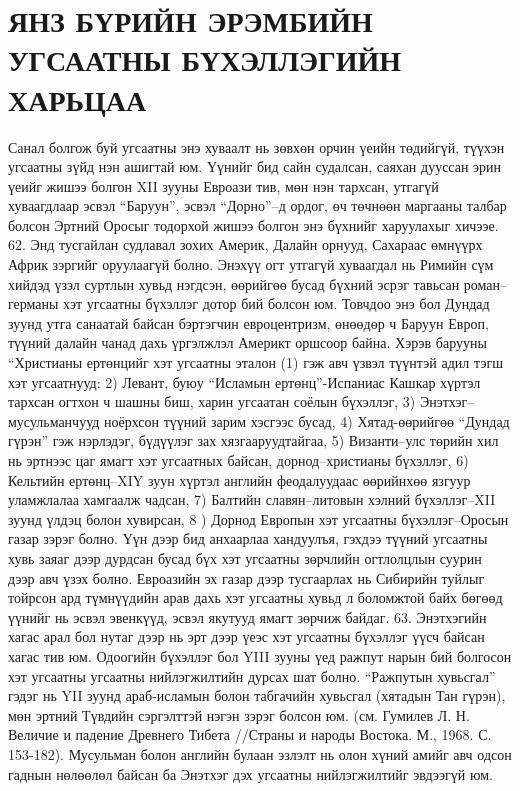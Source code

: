 \section{ЯНЗ БҮРИЙН ЭРЭМБИЙН УГСААТНЫ БҮХЭЛЛЭГИЙН ХАРЬЦАА}
Санал болгож буй угсаатны энэ хуваалт нь зөвхөн орчин үеийн төдийгүй, түүхэн угсаатны зүйд нэн ашигтай юм. Үүнийг бид сайн судалсан, саяхан дууссан эрин үеийг жишээ болгон XII зууны Евроази тив, мөн нэн тархсан, утгагүй хуваагдлаар эсвэл “Баруун”, эсвэл “Дорно”–д ордог, өч төчнөөн маргааны талбар болсон Эртний Оросыг тодорхой жишээ болгон энэ бүхнийг харуулахыг хичээе. 62. Энд тусгайлан судлавал зохих Америк, Далайн орнууд, Сахараас өмнүүрх Африк зэргийг оруулаагүй болно.
Энэхүү огт утгагүй хуваагдал нь Римийн сүм хийдэд үзэл суртлын хувьд нэгдсэн, өөрийгөө бусад бүхний эсрэг тавьсан роман–германы хэт угсаатны бүхэллэг дотор бий болсон юм. Товчдоо энэ бол Дундад зуунд утга санаатай байсан бэртэгчин евроцентризм, өнөөдөр ч Баруун Европ, түүний далайн чанад дахь үргэлжлэл Америкт оршсоор байна.
Хэрэв барууны “Христианы ертөнцийг хэт угсаатны эталон (1) гэж авч үзвэл түүнтэй адил тэгш хэт угсаатнууд: 2) Левант, буюу “Исламын ертөнц”-Испаниас Кашкар хүртэл тархсан огтхон ч шашны биш, харин угсаатан соёлын бүхэллэг, 3) Энэтхэг–мусульманчууд ноёрхсон түүний зарим хэсгээс бусад, 4) Хятад-өөрийгөө “Дундад гүрэн” гэж нэрлэдэг, бүдүүлэг зах хязгааруудтайгаа, 5) Византи–улс төрийн хил нь эртнээс цаг ямагт хэт угсаатных байсан, дорнод–христианы бүхэллэг, 6) Кельтийн ертөнц–XIY зуун хүртэл английн феодалуудаас өөрийнхөө язгуур уламжлалаа хамгаалж чадсан, 7) Балтийн славян–литовын хэлний бүхэллэг–XII зуунд үлдэц болон хувирсан, 8 ) Дорнод Европын хэт угсаатны бүхэллэг–Оросын газар зэрэг болно. Үүн дээр бид анхаарлаа хандуулъя, гэхдээ түүний угсаатны хувь заяаг дээр дурдсан бусад бүх хэт угсаатны зөрчлийн огтлолцлын суурин дээр авч үзэх болно. Евроазийн эх газар дээр тусгаарлах нь Сибирийн туйлыг тойрсон ард түмнүүдийн арав дахь хэт угсаатны хувьд л боломжтой байх бөгөөд үүнийг нь эсвэл эвенкүүд, эсвэл якутууд ямагт зөрчиж байдаг.
63. Энэтхэгийн хагас арал бол нутаг дээр нь эрт дээр үеэс хэт угсаатны бүхэллэг үүсч байсан хагас тив юм. Одоогийн бүхэллэг бол YIII зууны үед ражпут нарын бий болгосон хэт угсаатны угсаатны нийлэгжилтийн дурсах шат болно. “Ражпутын хувьсгал” гэдэг нь YII зуунд араб-исламын болон табгачийн хувьсгал (хятадын Тан гүрэн), мөн эртний Түвдийн сэргэлттэй нэгэн зэрэг болсон юм. (см. Гумилев Л. Н. Величие и падение Древнего Тибета //Страны и народы Востока. М., 1968. С. 153-182). Мусульман болон английн булаан эзлэлт нь олон хүний амийг авч одсон гаднын нөлөөлөл байсан ба Энэтхэг дэх угсаатны нийлэгжилтийг эвдээгүй юм.
